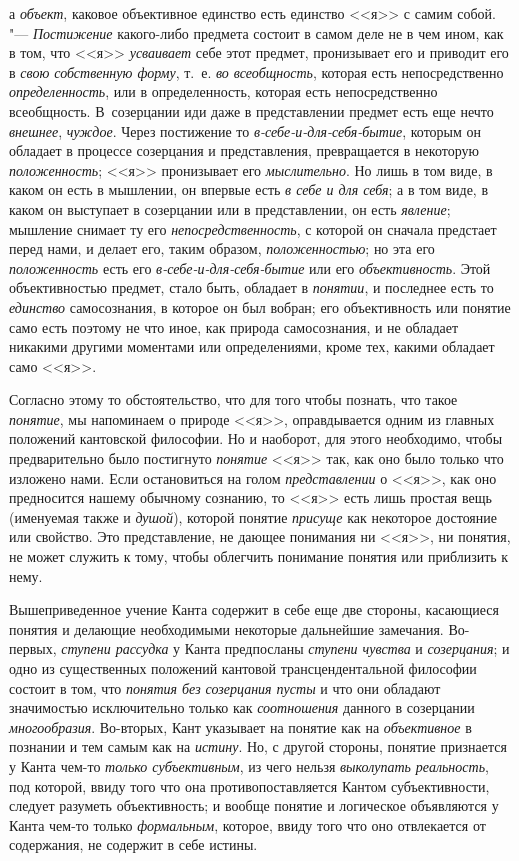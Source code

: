 а {\em объект}, каковое объективное единство есть единство <<я>> с самим собой. "---
{\em Постижение} какого-либо предмета состоит в самом деле не в чем ином, как
в том, что <<я>> {\em усваивает} себе этот предмет, пронизывает его и приводит его
в {\em свою собственную форму}, т.~е. {\em во всеобщность}, которая есть
непосредственно {\em определенность}, или в определенность, которая есть
непосредственно всеобщность. В~созерцании иди даже в представлении предмет
есть еще нечто {\em внешнее}, {\em чуждое}. Через постижение то
{\em в-себе-и-для-себя-бытие}, которым он обладает в процессе созерцания и
представления, превращается в некоторую {\em положенность}; <<я>> пронизывает
его {\em мыслительно}. Но лишь в том виде, в каком он есть в мышлении, он
впервые есть {\em в себе и для себя}; а в том виде, в каком он выступает в
созерцании или в представлении, он есть {\em явление}; мышление снимает ту
его {\em непосредственность}, с которой он сначала предстает перед нами, и
делает его, таким образом, {\em положенностью}; но эта его {\em положенность}
есть его {\em в-себе-и-для-себя-бытие} или его {\em объективность}. Этой
объективностью предмет, стало быть, обладает в {\em понятии}, и последнее
есть то {\em единство} самосознания, в которое он был вобран; его
объективность или понятие само есть поэтому не что иное, как природа
самосознания, и не обладает никакими другими моментами или определениями,
кроме тех, какими обладает само <<я>>.

Согласно этому то обстоятельство, что для того чтобы познать,
что такое {\em понятие},
мы напоминаем о природе <<я>>, оправдывается одним из главных
положений кантовской философии. Но и наоборот, для этого необходимо, чтобы
предварительно было постигнуто
{\em понятие} <<я>> так,
как оно было только что изложено нами. Если остановиться на голом
{\em представлении} о
<<я>>, как оно предносится нашему обычному сознанию, то <<я>> есть лишь простая
вещь (именуемая также и {\em душой}),
которой понятие
{\em присуще} как
некоторое достояние или свойство. Это представление, не дающее понимания ни
<<я>>, ни понятия, не может служить к тому, чтобы облегчить понимание понятия
или приблизить к нему.

Вышеприведенное учение Канта содержит в себе еще две стороны,
касающиеся понятия и делающие необходимыми некоторые дальнейшие замечания.
Во-первых, {\em ступени рассудка}
у Канта предпосланы
{\em ступени чувства} и
{\em созерцания}; и одно
из существенных положений кантовой трансцендентальной философии состоит в
том, что {\em понятия без созерцания
пусты} и что они обладают значимостью исключительно только
как {\em соотношения}
данного в созерцании
{\em многообразия}.
Во-вторых, Кант указывает на понятие как на
{\em объективное} в
познании и тем самым как на
{\em истину}. Но, с
другой стороны, понятие признается у Канта чем-то
{\em только субъективным},
из чего нельзя
{\em выколупать реальность},
под которой, ввиду того что она противопоставляется Кантом
субъективности, следует разуметь объективность; и вообще понятие и
логическое объявляются у Канта чем-то только
{\em формальным},
которое, ввиду того что оно отвлекается от содержания, не
содержит в себе истины.


